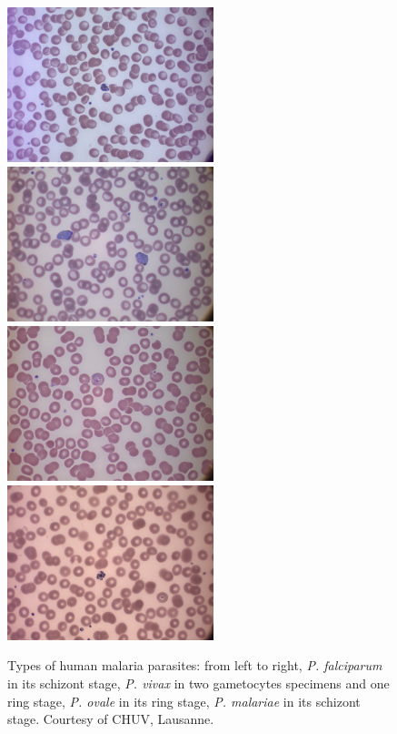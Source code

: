 \documentclass[final,a4paper,12pt,english]{UnicaPhdThesis3}
\begin{document}
\begin{figure}[H]
	\centering
	\includegraphics[width=6cm]{images/malaria/f2_Pfalciparum}
	\includegraphics[width=6cm]{images/malaria/f2_Pvivax}
	\includegraphics[width=6cm]{images/malaria/f2_Povale}
	\includegraphics[width=6cm]{images/malaria/f2_Pmalariae}
	\caption{\label{fig:malaria_types}Types of human malaria parasites: from left to right, \emph{P. falciparum} in its schizont stage, \emph{P. vivax} in two gametocytes specimens and one ring stage, \emph{P. ovale} in its ring stage, \emph{P. malariae} in its schizont stage.
		Courtesy of CHUV, Lausanne.}
\end{figure}
\end{document}
